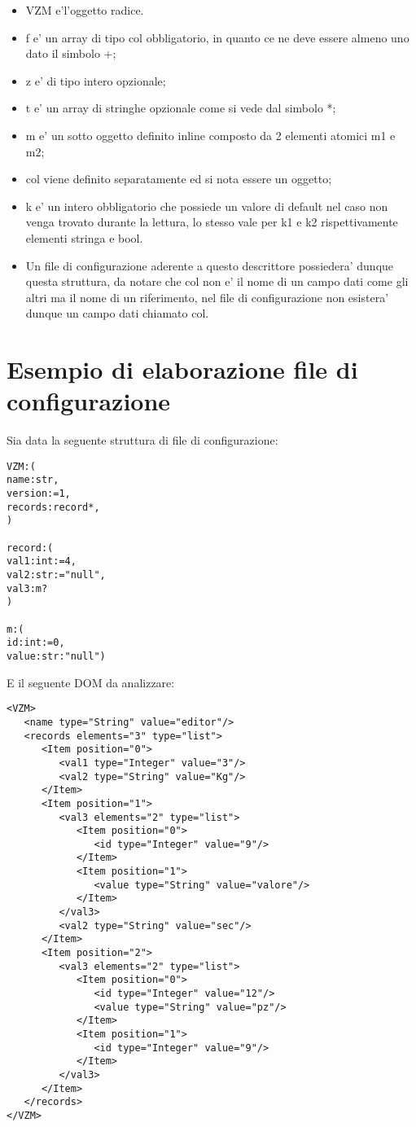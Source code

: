 \documentclass[11pt,titlepage,a4paper,twoside,openany]{book}
\begin{document}
\begin{itemize}
\item VZM e'l'oggetto radice.
\item f e' un array di tipo col obbligatorio, in quanto ce ne deve essere almeno uno dato il simbolo +;
\item z e' di tipo intero opzionale;
\item t e' un array di stringhe opzionale come si vede dal simbolo *;
\item m e' un sotto oggetto definito inline composto da 2 elementi atomici m1 e m2;
\item col viene definito separatamente ed si nota essere un oggetto;
\item k e' un intero obbligatorio che possiede un valore di default nel caso non venga trovato durante la lettura, lo stesso vale per k1 e k2 rispettivamente elementi stringa e bool.
\item Un file di configurazione aderente a questo descrittore possiedera' dunque questa struttura, da notare che col non e' il nome di un campo dati come gli altri ma il nome di un riferimento, nel file di configurazione non esistera' dunque un campo dati chiamato col.
\end{itemize}

\section[Esempio]{Esempio di elaborazione file di configurazione}

Sia data la seguente struttura di file di configurazione:
\lstset{language=make}
\begin{lstlisting}
VZM:(
name:str,
version:=1,
records:record*,
)

record:(
val1:int:=4,
val2:str:="null",
val3:m?
)

m:(
id:int:=0,
value:str:"null")

\end{lstlisting}

E il seguente DOM da analizzare:
\lstset{language=HTML}
\begin{lstlisting}
<VZM>
   <name type="String" value="editor"/>
   <records elements="3" type="list">
      <Item position="0">
         <val1 type="Integer" value="3"/>
         <val2 type="String" value="Kg"/>
      </Item>
      <Item position="1">
         <val3 elements="2" type="list">
            <Item position="0">
               <id type="Integer" value="9"/>
            </Item>
            <Item position="1">
               <value type="String" value="valore"/>
            </Item>
         </val3>
         <val2 type="String" value="sec"/>
      </Item>
      <Item position="2">
         <val3 elements="2" type="list">
            <Item position="0">
               <id type="Integer" value="12"/>
               <value type="String" value="pz"/>
            </Item>
            <Item position="1">
               <id type="Integer" value="9"/>
            </Item>
         </val3>
      </Item>
   </records>
</VZM>
\end{lstlisting}
\end{document}

